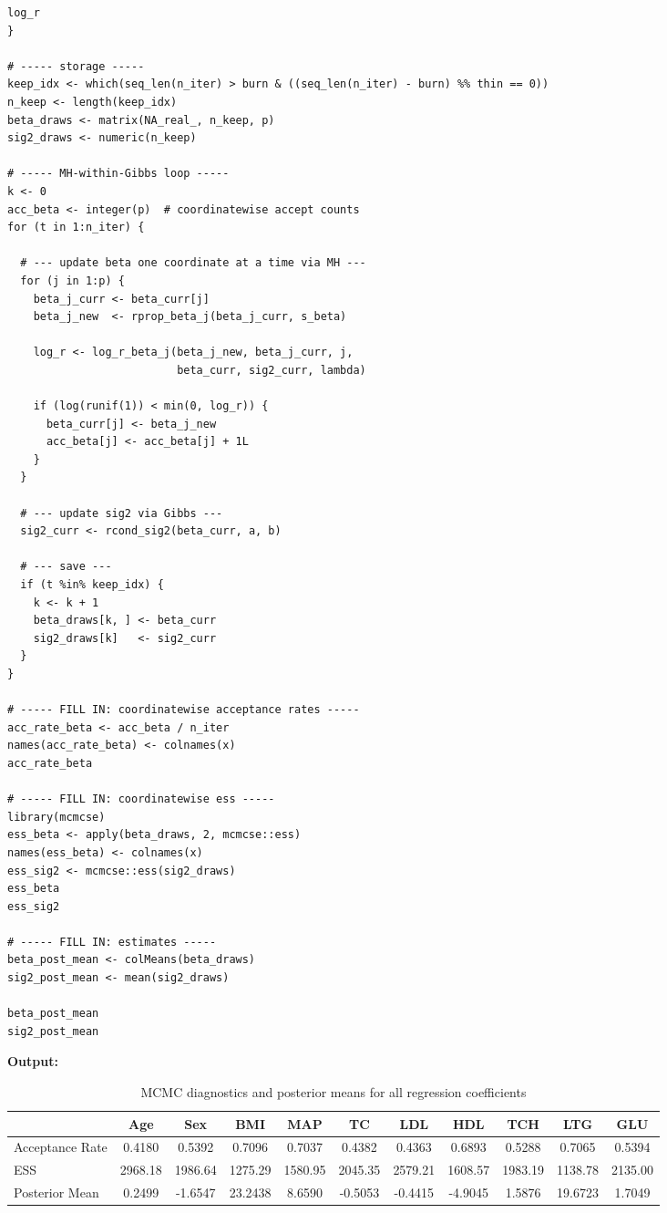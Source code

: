 \documentclass[hidelinks]{article}
\begin{document}
\begin{lstlisting}[caption={Metropolis within Gibb's Sampler}]
  log_r
}

# ----- storage -----
keep_idx <- which(seq_len(n_iter) > burn & ((seq_len(n_iter) - burn) %% thin == 0))
n_keep <- length(keep_idx)
beta_draws <- matrix(NA_real_, n_keep, p)
sig2_draws <- numeric(n_keep)

# ----- MH-within-Gibbs loop -----
k <- 0
acc_beta <- integer(p)  # coordinatewise accept counts
for (t in 1:n_iter) {
  
  # --- update beta one coordinate at a time via MH ---
  for (j in 1:p) {
    beta_j_curr <- beta_curr[j]
    beta_j_new  <- rprop_beta_j(beta_j_curr, s_beta)
    
    log_r <- log_r_beta_j(beta_j_new, beta_j_curr, j,
                          beta_curr, sig2_curr, lambda)
    
    if (log(runif(1)) < min(0, log_r)) {
      beta_curr[j] <- beta_j_new
      acc_beta[j] <- acc_beta[j] + 1L
    }
  }
  
  # --- update sig2 via Gibbs ---
  sig2_curr <- rcond_sig2(beta_curr, a, b)
  
  # --- save ---
  if (t %in% keep_idx) {
    k <- k + 1
    beta_draws[k, ] <- beta_curr
    sig2_draws[k]   <- sig2_curr
  }
}

# ----- FILL IN: coordinatewise acceptance rates -----
acc_rate_beta <- acc_beta / n_iter
names(acc_rate_beta) <- colnames(x)
acc_rate_beta

# ----- FILL IN: coordinatewise ess -----
library(mcmcse)
ess_beta <- apply(beta_draws, 2, mcmcse::ess)
names(ess_beta) <- colnames(x)
ess_sig2 <- mcmcse::ess(sig2_draws)
ess_beta
ess_sig2

# ----- FILL IN: estimates -----
beta_post_mean <- colMeans(beta_draws)
sig2_post_mean <- mean(sig2_draws)

beta_post_mean
sig2_post_mean
\end{lstlisting}

\noindent \textbf{Output:} 

\begin{table}[H]
\centering
\begin{tabular}{lcccccccccc}
\hline
 & \textbf{Age} & \textbf{Sex} & \textbf{BMI} & \textbf{MAP} & \textbf{TC} & \textbf{LDL} & \textbf{HDL} & \textbf{TCH} & \textbf{LTG} & \textbf{GLU} \\
\hline
Acceptance Rate 
& 0.4180 & 0.5392 & 0.7096 & 0.7037 & 0.4382 
& 0.4363 & 0.6893 & 0.5288 & 0.7065 & 0.5394 \\

ESS 
& 2968.18 & 1986.64 & 1275.29 & 1580.95 & 2045.35 
& 2579.21 & 1608.57 & 1983.19 & 1138.78 & 2135.00 \\

Posterior Mean 
& 0.2499 & -1.6547 & 23.2438 & 8.6590 & -0.5053 
& -0.4415 & -4.9045 & 1.5876 & 19.6723 & 1.7049 \\
\hline
\end{tabular}
\caption{MCMC diagnostics and posterior means for all regression coefficients}
\end{table}
\end{document}
